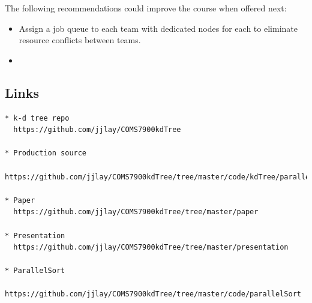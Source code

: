 \documentclass{article}
\begin{document}
The following recommendations could improve the course when offered next:

\begin{itemize}
    \item Assign a job queue to each team with dedicated nodes for each to eliminate resource conflicts between teams.
    \item 
\end{itemize}


%
%

\subsection{Links}

\begin{verbatim}
* k-d tree repo
  https://github.com/jjlay/COMS7900kdTree

* Production source
  https://github.com/jjlay/COMS7900kdTree/tree/master/code/kdTree/parallelApproved

* Paper
  https://github.com/jjlay/COMS7900kdTree/tree/master/paper

* Presentation
  https://github.com/jjlay/COMS7900kdTree/tree/master/presentation
  
* ParallelSort
  https://github.com/jjlay/COMS7900kdTree/tree/master/code/parallelSort
\end{verbatim}


\end{document}
